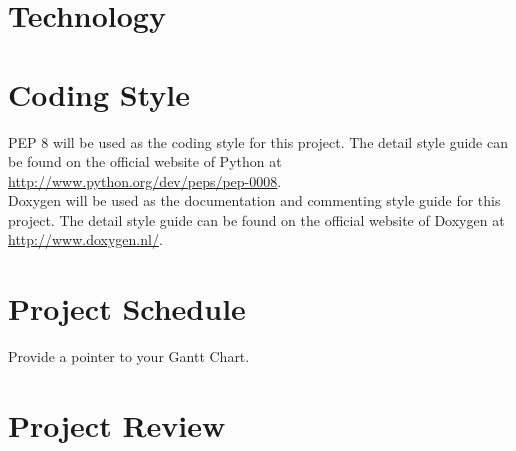 \documentclass{article}
\begin{document}
\section{Technology}

\section{Coding Style}

PEP 8 will be used as the coding style for this project. The detail style guide can be found on the official website of Python at \url{http://www.python.org/dev/peps/pep-0008}.\\
Doxygen will be used as the documentation and commenting style guide for this project. The detail style guide can be found on the official website of Doxygen at \url{http://www.doxygen.nl/}.

\section{Project Schedule}

Provide a pointer to your Gantt Chart.

\section{Project Review}
\end{document}
